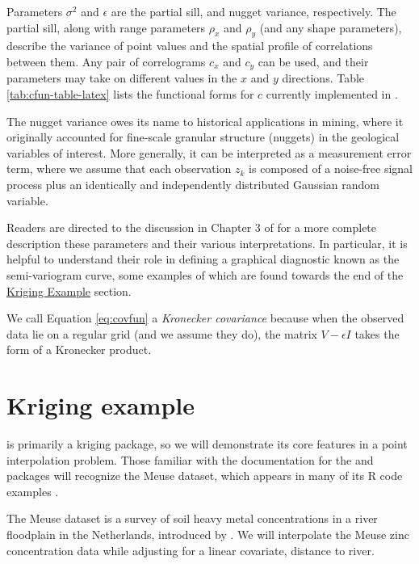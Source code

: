 Parameters \(\sigma^2\) and \(\epsilon\) are the partial sill, and nugget variance, respectively. The partial sill, along with range parameters \(\rho_x\) and \(\rho_y\) (and any shape parameters), describe the variance of point values and the spatial profile of correlations between them. Any pair of correlograms \(c_x\) and \(c_y\) can be used, and their parameters may take on different values in the \(x\) and \(y\) directions.
Table \ref{tab:cfun-table-latex}
lists the functional forms for \(c\) currently implemented in .

The nugget variance owes its name to historical applications in mining, where it originally accounted for fine-scale granular structure (nuggets) in the geological variables of interest. More generally, it can be interpreted as a measurement error term, where we assume that each observation \(z_k\) is composed of a noise-free signal process plus an identically and independently distributed Gaussian random variable.

Readers are directed to the discussion in Chapter 3 of \citet{cressie2015statistics} for a more complete description these parameters and their various interpretations. In particular, it is helpful to understand their role in defining a graphical diagnostic known as the semi-variogram curve, some examples of which are found towards the end of the \protect\hyperlink{kriging-example}{Kriging Example} section.

We call Equation \eqref{eq:covfun} a \emph{Kronecker covariance} because when the observed data lie on a regular grid (and we assume they do), the matrix \(V - \epsilon I\) takes the form of a Kronecker product.

\hypertarget{kriging-example}{%
\section{Kriging example}\label{kriging-example}}

 is primarily a kriging package, so we will demonstrate its core features in a point interpolation problem. Those familiar with the documentation for the  and  \citep{pebesma2005sp} packages will recognize the Meuse dataset, which appears in many of its R code examples \citep[\emph{eg.}][]{pebesma2022meuse}.

The Meuse dataset is a survey of soil heavy metal concentrations in a river floodplain in the Netherlands, introduced by \citet{burrough2015principles}. We will interpolate the Meuse zinc concentration data while adjusting for a linear covariate, distance to river.

